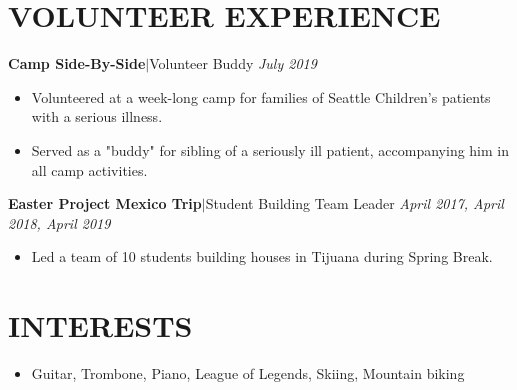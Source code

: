 \documentclass[11pt, a4paper, roman]{moderncv}
\newcommand{\entry}[4]{
	\textbf{#1}\:$|$\:#2 
	\hfill\textit{#3}
	#4
	\vspace{2mm}
}
\begin{document}
\section{VOLUNTEER EXPERIENCE}

{\entry{Camp Side-By-Side}{Volunteer Buddy}{July 2019}
	{\begin{itemize}
		\item Volunteered at a week-long camp for families of Seattle Children's patients with a serious illness.
		\item Served as a "buddy" for sibling of a seriously ill patient, accompanying him in all camp activities.
	\end{itemize}}
}
{\entry{Easter Project Mexico Trip}{Student Building Team Leader}{April 2017, April 2018, April 2019}
	{\begin{itemize}
		\item Led a team of 10 students building houses in Tijuana during Spring Break.
	\end{itemize}}
}

\section{INTERESTS}

\begin{itemize}
	\item Guitar, Trombone, Piano, League of Legends, Skiing, Mountain biking
\end{itemize}
\end{document}
